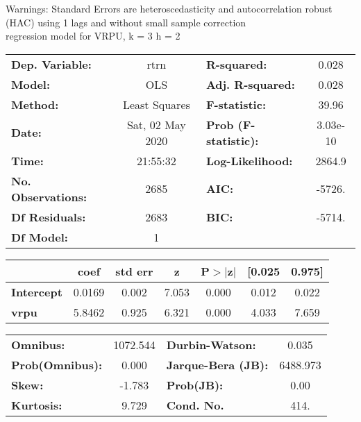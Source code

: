 Warnings: \newline
 [1] Standard Errors are heteroscedasticity and autocorrelation robust (HAC) using 1 lags and without small sample correction\\ 

regression model for VRPU, k = 3 h = 2\begin{center}
\begin{tabular}{lclc}
\toprule
\textbf{Dep. Variable:}    &       rtrn       & \textbf{  R-squared:         } &     0.028   \\
\textbf{Model:}            &       OLS        & \textbf{  Adj. R-squared:    } &     0.028   \\
\textbf{Method:}           &  Least Squares   & \textbf{  F-statistic:       } &     39.96   \\
\textbf{Date:}             & Sat, 02 May 2020 & \textbf{  Prob (F-statistic):} &  3.03e-10   \\
\textbf{Time:}             &     21:55:32     & \textbf{  Log-Likelihood:    } &    2864.9   \\
\textbf{No. Observations:} &        2685      & \textbf{  AIC:               } &    -5726.   \\
\textbf{Df Residuals:}     &        2683      & \textbf{  BIC:               } &    -5714.   \\
\textbf{Df Model:}         &           1      & \textbf{                     } &             \\
\bottomrule
\end{tabular}
\begin{tabular}{lcccccc}
                   & \textbf{coef} & \textbf{std err} & \textbf{z} & \textbf{P$> |$z$|$} & \textbf{[0.025} & \textbf{0.975]}  \\
\midrule
\textbf{Intercept} &       0.0169  &        0.002     &     7.053  &         0.000        &        0.012    &        0.022     \\
\textbf{vrpu}      &       5.8462  &        0.925     &     6.321  &         0.000        &        4.033    &        7.659     \\
\bottomrule
\end{tabular}
\begin{tabular}{lclc}
\textbf{Omnibus:}       & 1072.544 & \textbf{  Durbin-Watson:     } &    0.035  \\
\textbf{Prob(Omnibus):} &   0.000  & \textbf{  Jarque-Bera (JB):  } & 6488.973  \\
\textbf{Skew:}          &  -1.783  & \textbf{  Prob(JB):          } &     0.00  \\
\textbf{Kurtosis:}      &   9.729  & \textbf{  Cond. No.          } &     414.  \\
\bottomrule
\end{tabular}
\end{center}

